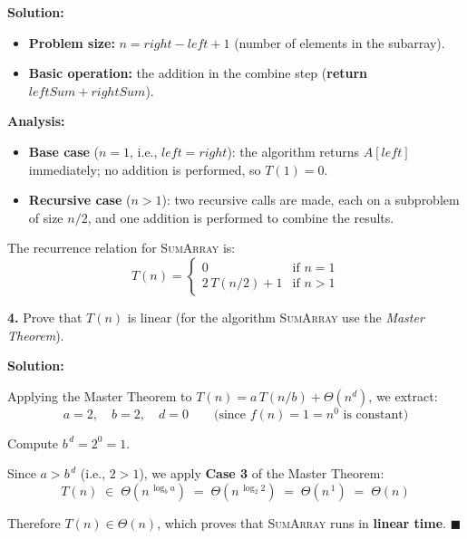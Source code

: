\documentclass[12pt]{article}
\newcommand{\algoname}[1]{\textsc{#1}}
\begin{document}
\medskip

\begin{mdframed}
\noindent\textbf{Solution:}

\smallskip
\begin{itemize}
    \item \textbf{Problem size:} $n = right - left + 1$
          (number of elements in the subarray).
    \item \textbf{Basic operation:} the addition in the combine step
          (\textbf{return} $leftSum + rightSum$).
\end{itemize}

\noindent\textbf{Analysis:}
\begin{itemize}
    \item \textbf{Base case} ($n = 1$, i.e., $left = right$):
          the algorithm returns $A[left]$ immediately; no addition is
          performed, so $T(1) = 0$.
    \item \textbf{Recursive case} ($n > 1$):
          two recursive calls are made, each on a subproblem of size
          $n/2$, and one addition is performed to combine the results.
\end{itemize}

\noindent The recurrence relation for \algoname{SumArray} is:
\[
    T(n) =
    \begin{cases}
        0              & \text{if } n = 1 \\[6pt]
        2\,T(n/2) + 1  & \text{if } n > 1
    \end{cases}
\]
\end{mdframed}

\bigskip

\noindent\textbf{4.} Prove that $T(n)$ is linear (for the algorithm
\algoname{SumArray} use the \textit{Master Theorem}).

\medskip

\begin{mdframed}
\noindent\textbf{Solution:}

\smallskip
\noindent
Applying the Master Theorem to $T(n) = a\,T(n/b) + \Theta(n^d)$, we
extract:
\[
    a = 2,\quad b = 2,\quad d = 0
    \qquad\bigl(\text{since } f(n) = 1 = n^0 \text{ is constant}\bigr)
\]

\noindent Compute $b^{\,d} = 2^0 = 1$.

\medskip
\noindent Since $a > b^{\,d}$ (i.e., $2 > 1$), we apply \textbf{Case 3}
of the Master Theorem:
\[
    T(n) \;\in\;
    \Theta\!\left(n^{\,\log_b a}\right)
    \;=\;
    \Theta\!\left(n^{\,\log_2 2}\right)
    \;=\;
    \Theta\!\left(n^{\,1}\right)
    \;=\;
    \Theta(n)
\]

\noindent Therefore $T(n) \in \Theta(n)$, which proves that
\algoname{SumArray} runs in \textbf{linear time}. \qquad $\blacksquare$
\end{mdframed}
\end{document}
